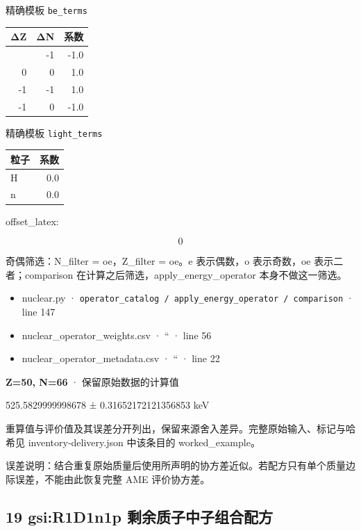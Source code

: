 \documentclass[
  11pt,
  letterpaper,
]{article}
\providecommand{\tightlist}{%
  \setlength{\itemsep}{0pt}\setlength{\parskip}{0pt}}
\begin{document}
精确模板 \texttt{be\_terms}

\begin{longtable}[]{@{}rrr@{}}
\toprule\noalign{}
ΔZ & ΔN & 系数 \\
\midrule\noalign{}
\endhead
\bottomrule\noalign{}
\endlastfoot
0 & -1 & -1.0 \\
0 & 0 & 1.0 \\
-1 & -1 & 1.0 \\
-1 & 0 & -1.0 \\
\end{longtable}

精确模板 \texttt{light\_terms}

\begin{longtable}[]{@{}lr@{}}
\toprule\noalign{}
粒子 & 系数 \\
\midrule\noalign{}
\endhead
\bottomrule\noalign{}
\endlastfoot
H & 0.0 \\
n & 0.0 \\
\end{longtable}

offset\_latex:

\[
0
\]

奇偶筛选：N\_filter = oe，Z\_filter = oe。e 表示偶数，o 表示奇数，oe
表示二者；comparison 在计算之后筛选，apply\_energy\_operator
本身不做这一筛选。

\begin{itemize}
\tightlist
\item
  nuclear.py ·
  \texttt{operator\_catalog\ /\ apply\_energy\_operator\ /\ comparison}
  · line 147
\item
  nuclear\_operator\_weights.csv · `` · line 56
\item
  nuclear\_operator\_metadata.csv · `` · line 22
\end{itemize}

\textbf{Z=50, N=66} · 保留原始数据的计算值

525.5829999998678 ± 0.31652172121356853 keV

重算值与评价值及其误差分开列出，保留来源舍入差异。完整原始输入、标记与哈希见
inventory-delivery.json 中该条目的 worked\_example。

误差说明：结合重复原始质量后使用所声明的协方差近似。若配方只有单个质量边际误差，不能由此恢复完整
AME 评价协方差。

\subsection{19 gsi:R1D1n1p
剩余质子中子组合配方}\label{gsir1d1n1p-ux5269ux4f59ux8d28ux5b50ux4e2dux5b50ux7ec4ux5408ux914dux65b9}
\end{document}
